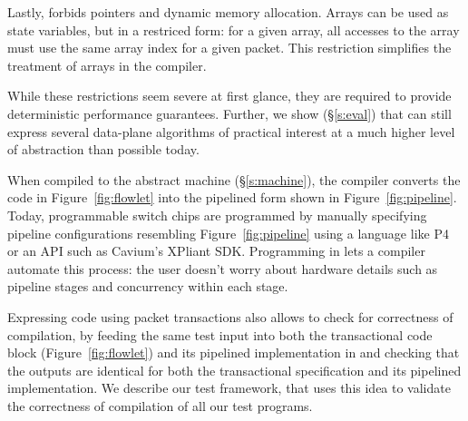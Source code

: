 Lastly, \pktlanguage forbids pointers and dynamic memory allocation. Arrays can
be used as state variables, but in a restriced form: for a given array, all
accesses to the array must use the same array index for a given packet. This
restriction simplifies the treatment of arrays in the compiler.

While these restrictions seem severe at first glance, they are required to
provide deterministic performance guarantees. Further, we show (\S\ref{s:eval})
that \pktlanguage can still express several data-plane algorithms  of practical
interest at a much higher level of abstraction than possible today.

When compiled to the \absmachine abstract machine (\S\ref{s:machine}), the
\pktlanguage compiler converts the code in Figure~\ref{fig:flowlet} into the
pipelined form shown in Figure~\ref{fig:pipeline}. Today, programmable switch
chips are programmed by manually specifying pipeline configurations resembling
Figure~\ref{fig:pipeline} using a language like P4 or an API such as Cavium's
XPliant SDK. Programming in \pktlanguage lets a compiler automate this process:
the user doesn't worry about hardware details such as pipeline stages and
concurrency within each stage.

Expressing code using packet transactions also allows to check for correctness
of compilation, by feeding the same test input into both the transactional code
block (Figure~\ref{fig:flowlet}) and its pipelined implementation in
\absmachine and checking that the outputs are identical for both the
transactional specification and its pipelined implementation. We describe our
test framework, \tester that uses this idea to validate the correctness of
compilation of all our test programs.



